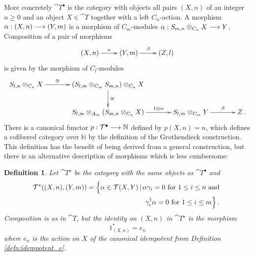 \documentclass[english,letter paper,12pt,leqno]{article}
\theoremstyle{example}
\newtheorem{definition}[theorem]{Definition}
\numberwithin{equation}{section}
\begin{document}
More concretely $\cat{T}^\bullet$ is the category with objects all pairs $(X,n)$ of an integer $n \ge 0$ and an object $X \in \cat{T}$ together with a left $C_n$-action. A morphism $\alpha: (X,n) \longrightarrow (Y,m)$ is a morphism of $C_m$-modules $\alpha: S_{m,n} \otimes_{C_n} X \longrightarrow Y$. Composition of a pair of morphisms
\begin{equation}\label{eq:comp_chain0}
\xymatrix{
(X,n) \ar[r]^-{\alpha} & (Y,m) \ar[r]^-{\beta} & (Z,l)
}
\end{equation}
is given by the morphism of $C_l$-modules
\begin{equation}\label{eq:comp_chain1}
\xymatrix@C+1pc{
S_{l, n} \otimes_{C_n} X \ar[r]^-{\cong} & (S_{l,m} \otimes_{C_m} S_{m,n}) \otimes_{C_n} X \ar[d]^-{\cong}\\
& S_{l,m} \otimes_{A_m} ( S_{m,n} \otimes_{C_n} X ) \ar[r]^-{ 1 \otimes \alpha } & S_{l,m} \otimes_{C_m} Y \ar[r]^-{\beta} & Z\,.
}
\end{equation}
There is a canonical functor $p: \mathcal{T}^\bullet \longrightarrow \mathbb{N}$ defined by $p(X,n) = n$, which defines a cofibered category over $\mathbb{N}$ by the definition of the Grothendieck construction. This definition has the benefit of being derived from a general construction, but there is an alternative description of morphisms which is less cumbersome:

\begin{definition} Let $\cat{T}^{\star}$ be the category with the same objects as $\cat{T}^\bullet$ and
\begin{align*}
\mathcal{T}^{\star}( (X,n), (Y,m) ) &= \Big\{ \alpha \in \mathcal{T}(X,Y) \,|\, \alpha \gamma_i = 0 \text{ for } 1 \le i \le n \text{ and }\\
&\qquad \qquad\qquad \qquad \;\; \gamma_i^\dagger \alpha = 0 \text{ for } 1 \le i \le m \Big\}\,.
\end{align*}
Composition is as in $\cat{T}$, but the identity on $(X,n)$ in $\cat{T}^\star$ is the morphism
\[
1^*_{(X,n)} = e_n
\]
where $e_n$ is the action on $X$ of the canonical idempotent from Definition \ref{defn:idempotent_e}.
\end{definition}
\end{document}
